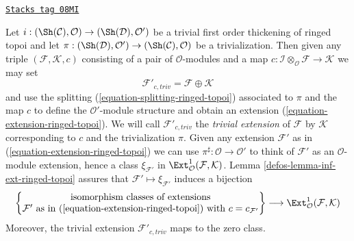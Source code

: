 \begin{remark}
\label{defos-remark-trivial-extension-ringed-topoi}
\href{https://stacks.math.columbia.edu/tag/08MI}{\texttt{Stacks tag 08MI}}

Let $i : (\Sh(\mathcal{C}), \mathcal{O}) \to (\Sh(\mathcal{D}), \mathcal{O}')$
be a trivial first order thickening of ringed topoi
and let $\pi : (\Sh(\mathcal{D}), \mathcal{O}') \to
(\Sh(\mathcal{C}), \mathcal{O})$ be a trivialization. Then given any triple
$(\mathcal{F}, \mathcal{K}, c)$ consisting of a pair of
$\mathcal{O}$-modules and a map
$c : \mathcal{I} \otimes_\mathcal{O} \mathcal{F} \to \mathcal{K}$
we may set
$$
\mathcal{F}'_{c, triv} = \mathcal{F} \oplus \mathcal{K}
$$
and use the splitting (\ref{equation-splitting-ringed-topoi})
associated to $\pi$ and the map $c$ to define the $\mathcal{O}'$-module
structure and obtain an extension (\ref{equation-extension-ringed-topoi}).
We will call $\mathcal{F}'_{c, triv}$ the {\it trivial extension} of
$\mathcal{F}$ by $\mathcal{K}$ corresponding
to $c$ and the trivialization $\pi$. Given any extension
$\mathcal{F}'$ as in (\ref{equation-extension-ringed-topoi}) we can use
$\pi^\sharp : \mathcal{O} \to \mathcal{O}'$ to think of $\mathcal{F}'$
as an $\mathcal{O}$-module extension, hence a class $\xi_{\mathcal{F}'}$
in $\Ext^1_\mathcal{O}(\mathcal{F}, \mathcal{K})$.
Lemma \ref{defos-lemma-inf-ext-ringed-topoi} assures that
$\mathcal{F}' \mapsto \xi_{\mathcal{F}'}$
induces a bijection
$$
\left\{
\begin{matrix}
\text{isomorphism classes of extensions}\\
\mathcal{F}'\text{ as in (\ref{equation-extension-ringed-topoi}) with }
c = c_{\mathcal{F}'}
\end{matrix}
\right\}
\longrightarrow
\Ext^1_\mathcal{O}(\mathcal{F}, \mathcal{K})
$$
Moreover, the trivial extension $\mathcal{F}'_{c, triv}$ maps to the zero class.
\end{remark}

